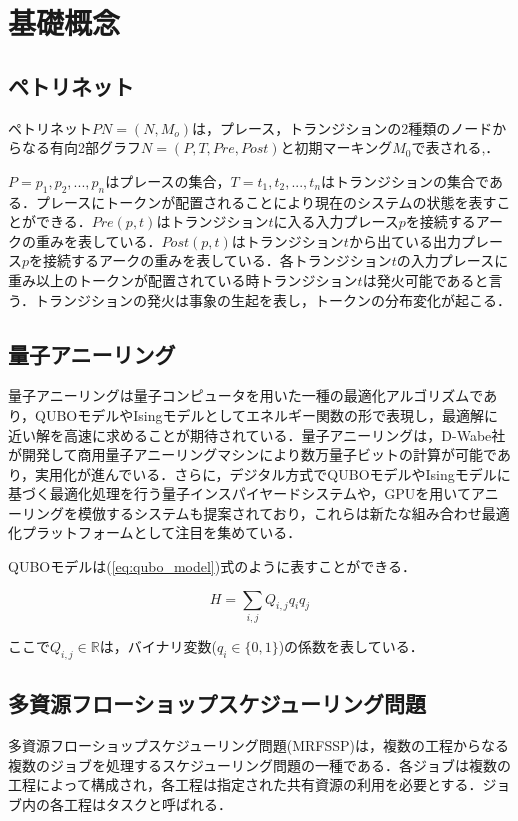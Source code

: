 \chapter{基礎概念}
\label{chap:concept}

\section{ペトリネット}
ペトリネット$PN = (N,M_o)$は，プレース，トランジションの2種類のノードからなる有向2部グラフ$N = (P,T,Pre,Post)$と初期マーキング$M_0$で表される\cite{murata},\cite{cpn}．

$P = {p_1, p_2, ..., p_n}$はプレースの集合，$T = {t_1, t_2, ..., t_n}$はトランジションの集合である．プレースにトークンが配置されることにより現在のシステムの状態を表すことができる．$Pre(p,t)$はトランジション$t$に入る入力プレース$p$を接続するアークの重みを表している．$Post(p,t)$はトランジション$t$から出ている出力プレース$p$を接続するアークの重みを表している．各トランジション$t$の入力プレースに重み以上のトークンが配置されている時トランジション$t$は発火可能であると言う．トランジションの発火は事象の生起を表し，トークンの分布変化が起こる．

\section{量子アニーリング}
量子アニーリングは量子コンピュータを用いた一種の最適化アルゴリズムであり，QUBOモデルやIsingモデルとしてエネルギー関数の形で表現し，最適解に近い解を高速に求めることが期待されている．量子アニーリングは，D-Wabe社が開発して商用量子アニーリングマシンにより数万量子ビットの計算が可能であり，実用化が進んでいる．さらに，デジタル方式でQUBOモデルやIsingモデルに基づく最適化処理を行う量子インスパイヤードシステムや，GPUを用いてアニーリングを模倣するシステムも提案されており，これらは新たな組み合わせ最適化プラットフォームとして注目を集めている．

QUBOモデルは(\ref{eq:qubo_model})式のように表すことができる．

\begin{equation}
H = \sum_{i,j} Q_{i,j}q_i q_j
\label{eq:qubo_model}
\end{equation}

ここで$Q_{i,j}\in \mathbb{R}$は，バイナリ変数($q_i \in \{0,1\}$)の係数を表している．

\section{多資源フローショップスケジューリング問題}
多資源フローショップスケジューリング問題(MRFSSP)は，複数の工程からなる複数のジョブを処理するスケジューリング問題の一種である\cite{nouri}．各ジョブは複数の工程によって構成され，各工程は指定された共有資源の利用を必要とする．ジョブ内の各工程はタスクと呼ばれる．

